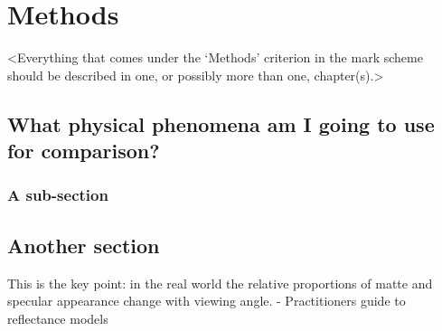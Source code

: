 \chapter{Methods}
\label{chapter2}

<Everything that comes under the `Methods' criterion in the mark scheme should be described in one, or possibly more than one, chapter(s).>

\section{What physical phenomena am I going to use for comparison?}
\lipsum[5]

\subsection{A sub-section}
\lipsum[6]

\section{Another section}
\lipsum[7]

This is the key point: in the real world the relative proportions of matte and specular appearance change with viewing
angle. - Practitioners guide to reflectance models
